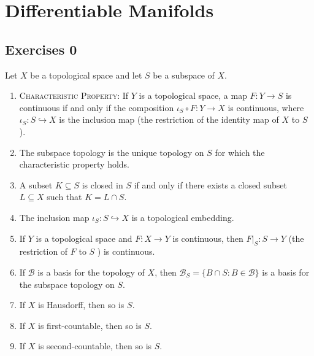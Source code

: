 \newcommand*{\x}{\mathbf{x}}
\newcommand*{\y}{\mathbf{y}}
\newcommand*{\z}{\mathbf{z}}
\chapter{Differentiable Manifolds}
\section{Exercises 0}
\begin{proposition}
    Let $X$ be a topological space and let $S$ be a subspace of $X$.\cite{Huybrechts2010Complex}
    \begin{enumerate}[label=(\alph*)]
        \item {\color{靛蓝}\textsc{Characteristic Property}: If $Y$ is a topological space, a map $F: Y \rightarrow S$ is continuous if and only if the composition  $\iota_S \circ F: Y \rightarrow X$ is continuous, where $\iota_S: S \hookrightarrow X$ is the inclusion map (the restriction of the identity map of $X$ to $S$ ).}
        \item The subspace topology is the unique topology on $S$ for which the characteristic property holds.
        \item A subset $K \subseteq S$ is closed in $S$ if and only if there exists a closed subset $L \subseteq X$ such that $K=L \cap S$.
        \item The inclusion map $\iota_S: S \hookrightarrow X$ is a topological embedding.
        \item If $Y$ is a topological space and $F: X \rightarrow Y$ is continuous, then $\left.F\right|_S: S \rightarrow Y$ (the restriction of $F$ to $S$ ) is continuous.
        \item If $\mathscr{B}$ is a basis for the topology of $X$, then $\mathscr{B}_S=\{B \cap S: B \in \mathscr{B}\}$ is a basis for the subspace topology on $S$.
        \item If $X$ is Hausdorff, then so is $S$.
        \item If $X$ is first-countable, then so is $S$.
        \item If $X$ is second-countable, then so is $S$.
    \end{enumerate}
\end{proposition}
